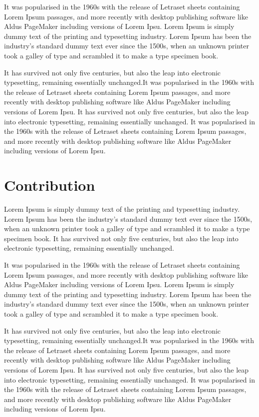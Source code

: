 It was popularised in the 1960s with the release of Letraset sheets containing Lorem Ipsum passages, and more recently with desktop publishing software like Aldus PageMaker including versions of Lorem Ipsu. Lorem Ipsum is simply dummy text of the printing and typesetting industry. Lorem Ipsum has been the industry's standard dummy text ever since the 1500s, when an unknown printer took a galley of type and scrambled it to make a type specimen book.

It has survived not only five centuries, but also the leap into electronic typesetting, remaining essentially unchanged.It was popularised in the 1960s with the release of Letraset sheets containing Lorem Ipsum passages, and more recently with desktop publishing software like Aldus PageMaker including versions of Lorem Ipsu. It has survived not only five centuries, but also the leap into electronic typesetting, remaining essentially unchanged. It was popularised in the 1960s with the release of Letraset sheets containing Lorem Ipsum passages, and more recently with desktop publishing software like Aldus PageMaker including versions of Lorem Ipsu.

\section{Contribution}
Lorem Ipsum is simply dummy text of the printing and typesetting industry. Lorem Ipsum has been the industry's standard dummy text ever since the 1500s, when an unknown printer took a galley of type and scrambled it to make a type specimen book. It has survived not only five centuries, but also the leap into electronic typesetting, remaining essentially unchanged.

It was popularised in the 1960s with the release of Letraset sheets containing Lorem Ipsum passages, and more recently with desktop publishing software like Aldus PageMaker including versions of Lorem Ipsu. Lorem Ipsum is simply dummy text of the printing and typesetting industry. Lorem Ipsum has been the industry's standard dummy text ever since the 1500s, when an unknown printer took a galley of type and scrambled it to make a type specimen book.

It has survived not only five centuries, but also the leap into electronic typesetting, remaining essentially unchanged.It was popularised in the 1960s with the release of Letraset sheets containing Lorem Ipsum passages, and more recently with desktop publishing software like Aldus PageMaker including versions of Lorem Ipsu. It has survived not only five centuries, but also the leap into electronic typesetting, remaining essentially unchanged. It was popularised in the 1960s with the release of Letraset sheets containing Lorem Ipsum passages, and more recently with desktop publishing software like Aldus PageMaker including versions of Lorem Ipsu.

